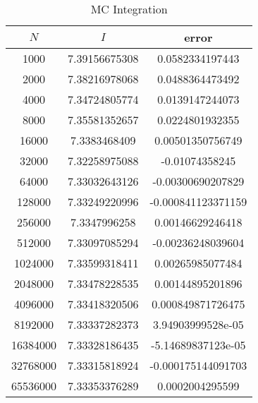 \begin{table}[h]
\centering
\begin{tabular}{ccc}
\hline\hline
$N$ & $I$ & error \\
\hline
1000 & 7.39156675308 & 0.0582334197443 \\
2000 & 7.38216978068 & 0.0488364473492 \\
4000 & 7.34724805774 & 0.0139147244073 \\
8000 & 7.35581352657 & 0.0224801932355 \\
16000 & 7.3383468409 & 0.00501350756749 \\
32000 & 7.32258975088 & -0.01074358245 \\
64000 & 7.33032643126 & -0.00300690207829 \\
128000 & 7.33249220996 & -0.000841123371159 \\
256000 & 7.3347996258 & 0.00146629246418 \\
512000 & 7.33097085294 & -0.00236248039604 \\
1024000 & 7.33599318411 & 0.00265985077484 \\
2048000 & 7.33478228535 & 0.00144895201896 \\
4096000 & 7.33418320506 & 0.000849871726475 \\
8192000 & 7.33337282373 & 3.94903999528e-05 \\
16384000 & 7.33328186435 & -5.14689837123e-05 \\
32768000 & 7.33315818924 & -0.000175144091703 \\
65536000 & 7.33353376289 & 0.0002004295599 \\
\hline\hline
\end{tabular}
\label{tb3}
\caption{MC Integration}
\end{table}
